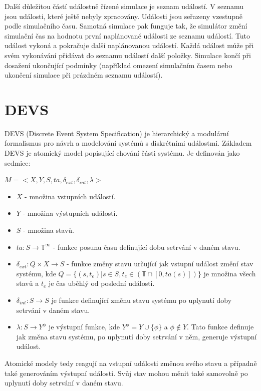 Další důležitou částí událostně řízené simulace je seznam událostí. V seznamu jsou události, které ještě nebyly zpracovány. Události jsou seřazeny
vzestupně podle simulačního času. Samotná simulace pak funguje tak, že simulátor změní simulační čas na hodnotu první naplánované události ze seznamu událostí. Tuto událost vykoná a pokračuje další naplánovanou událostí. Každá událost může při svém vykonávání přidávat do seznamu událostí další položky. Simulace končí při dosažení ukončující podmínky (například omezení simulačním časem nebo ukončení simulace při prázdném seznamu událostí).

\section{DEVS}

DEVS (Discrete Event System Specification) je hierarchický a modulární formalismus pro návrh a modelování systémů s diskrétními událostmi.
Základem DEVS je atomický model popisující chování části systému. Je definován jako sedmice:

\begin{math}
M=<X,Y,S,ta, \delta_{ext}, \delta_{int}, \lambda>
\end{math}

\begin{itemize}
\item $X$ - množina vstupních událostí.
\item $Y$ - množina výstupních událostí.
\item $S$ - množina stavů.
\item $ta:S \rightarrow \mathbb{T}^\infty$ - funkce posunu času definující dobu setrvání v daném stavu.
\item $\delta_{ext}:Q \times X \rightarrow  S$ - funkce změny stavu určující jak vstupní událost změní stav systému, kde $Q=\{(s,t_e)|s \in S, t_e \in (\mathbb{T} \cap [0, ta(s)])\}$ je množina všech stavů a $t_e$ je čas uběhlý od poslední události.
\item $\delta_{int}:S \rightarrow S$ je funkce definující změnu stavu systému po uplynutí doby setrvání v daném stavu.
\item $\lambda:S \rightarrow  Y^\phi$ je výstupní funkce, kde $Y^\phi=Y \cup \{\phi\}$ a $\phi \not\in Y$. Tato funkce definuje jak změna stavu systému, po uplynutí doby setrvání v něm, generuje výstupní událost.
\end{itemize}

Atomické modely tedy reagují na vstupní události změnou svého stavu a případně také generováním výstupní události. Svůj stav mohou měnit také samovolně po uplynutí doby setrvání v daném stavu.

